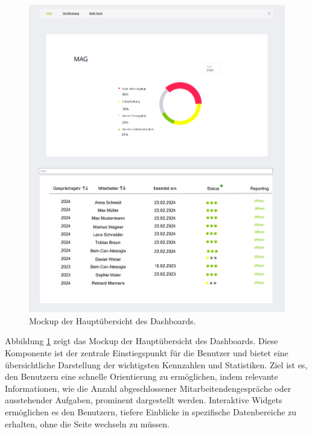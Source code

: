 \newpage
\begin{figure}[h!]
    \centering
    \includegraphics[width=\textwidth]
{images/Dashboard.png}
    \caption{Mockup der Hauptübersicht des Dashboards.}
    \label{fig:mockup1}
\end{figure}
\noindent
Abbildung \ref{fig:mockup1} zeigt das Mockup der Hauptübersicht des Dashboards. Diese Komponente ist der zentrale Einstiegspunkt für die Benutzer und bietet eine übersichtliche Darstellung der wichtigsten Kennzahlen und Statistiken. Ziel ist es, den Benutzern eine schnelle Orientierung zu ermöglichen, indem relevante Informationen, wie die Anzahl abgeschlossener Mitarbeitendengespräche oder ausstehender Aufgaben, prominent dargestellt werden. Interaktive Widgets ermöglichen es den Benutzern, tiefere Einblicke in spezifische Datenbereiche zu erhalten, ohne die Seite wechseln zu müssen.

